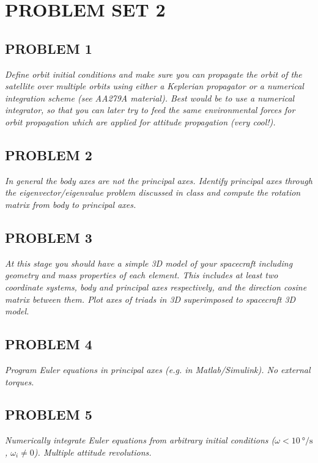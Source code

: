 \section{\Large PROBLEM SET 2}
\subsection{PROBLEM 1}
\textit{Define orbit initial conditions and make sure you can propagate the orbit of the satellite over multiple orbits using either a Keplerian propagator or a numerical integration scheme (see AA279A material). Best would be to use a numerical integrator, so that you can later try to feed the same environmental forces for orbit propagation which are applied for attitude propagation (very cool!).}


\subsection{PROBLEM 2}
\textit{In general the body axes are not the principal axes. Identify principal axes through the eigenvector/eigenvalue problem discussed in class and compute the rotation matrix from body to principal axes.}


\subsection{PROBLEM 3}
\textit{At this stage you should have a simple 3D model of your spacecraft including geometry and mass properties of each element. This includes at least two coordinate systems, body and principal axes respectively, and the direction cosine matrix between them. Plot axes of triads in 3D superimposed to spacecraft 3D model.}


\subsection{PROBLEM 4}
\textit{Program Euler equations in principal axes (e.g. in Matlab/Simulink). No external torques.}


\subsection{PROBLEM 5}
\textit{Numerically integrate Euler equations from arbitrary initial conditions ($\omega<\qty{10}{\degree/\second}$, $\omega_{i}\neq0$). Multiple attitude revolutions.}


